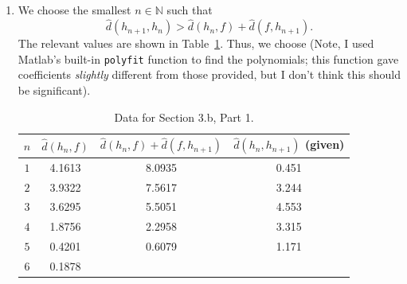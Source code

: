 \documentclass[11pt]{article}
\newcommand{\N}{\mathbb{N}} %
\begin{document}
\subsection{}
\begin{enumerate}[1.]
\item We choose the smallest $n \in \N$ such that
\[\hat{d}(h_{n + 1},h_n) > \hat{d}(h_n,f) + \hat{d}(f,h_{n + 1}).\]
The relevant values are shown in Table~\ref{tab:3.b.1}. Thus, we choose
 (Note, I used Matlab's built-in \texttt{polyfit} function to
find the polynomials; this function gave coefficients \emph{slightly}
different from those provided, but I don't think this should be significant).

\begin{table}
\centering
\begin{tabular}{|c|c|c|c|}
\hline
$n$  & $\hat{d}(h_n,f)$ & $\hat{d}(h_n,f) + \hat{d}(f,h_{n + 1})$   & $\hat{d}(h_n,h_{n + 1})$ (given)  \\
\hline
$1$  & 4.1613           & 8.0935                                    & 0.451                             \\
\hline
$2$  & 3.9322           & 7.5617                                    & 3.244                             \\
\hline
$3$  & 3.6295           & 5.5051                                    & 4.553                             \\
\hline
$4$  & 1.8756           & 2.2958                                    & 3.315                             \\
\hline
$5$  & 0.4201           & 0.6079                                    & 1.171                             \\
\hline
$6$  & 0.1878           &                                           &                                   \\
\hline
\end{tabular}
\caption{Data for Section 3.b, Part 1.}
\label{tab:3.b.1}
\end{table}
\end{enumerate}
\end{document}
